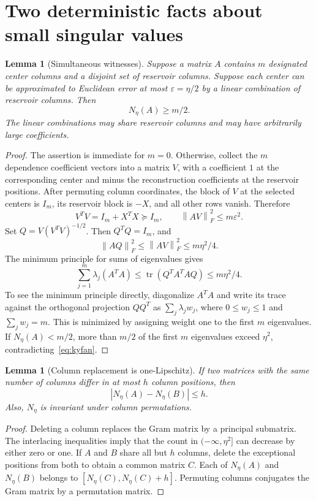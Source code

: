 \documentclass[11pt,a4paper]{article}
\newtheorem{lemma}[theorem]{Lemma}
\theoremstyle{remark}\newtheorem{remark}[theorem]{Remark}
\newcommand{\tr}{\operatorname{tr}}
\newcommand{\norm}[1]{\left\lVert #1\right\rVert}
\begin{document}
\section{Two deterministic facts about small singular values}
\begin{lemma}[Simultaneous witnesses]\label{lem:witness}
Suppose a matrix $A$ contains $m$ designated center columns and a disjoint set of reservoir columns. Suppose each center can be approximated to Euclidean error at most $\varepsilon=\eta/2$ by a linear combination of reservoir columns. Then
\[
 N_\eta(A)\ge m/2.
\]
The linear combinations may share reservoir columns and may have arbitrarily large coefficients.
\end{lemma}
\begin{proof}
The assertion is immediate for $m=0$. Otherwise, collect the $m$ dependence coefficient vectors into a matrix $V$, with a coefficient $1$ at the corresponding center and minus the reconstruction coefficients at the reservoir positions. After permuting column coordinates, the block of $V$ at the selected centers is $I_m$, its reservoir block is $-X$, and all other rows vanish. Therefore
\[
 V^TV=I_m+X^TX\succeq I_m,\qquad \norm{AV}_F^2\le m\varepsilon^2.
\]
Set $Q=V(V^TV)^{-1/2}$. Then $Q^TQ=I_m$, and
\[
 \norm{AQ}_F^2\le\norm{AV}_F^2\le m\eta^2/4.
\]
The minimum principle for sums of eigenvalues gives
\begin{equation}\label{eq:kyfan}
 \sum_{j=1}^m\lambda_j(A^TA)
 \le\tr(Q^TA^TAQ)\le m\eta^2/4.
\end{equation}
To see the minimum principle directly, diagonalize $A^TA$ and write its trace against the orthogonal projection $QQ^T$ as $\sum_j\lambda_jw_j$, where $0\le w_j\le1$ and $\sum_jw_j=m$. This is minimized by assigning weight one to the first $m$ eigenvalues. If $N_\eta(A)<m/2$, more than $m/2$ of the first $m$ eigenvalues exceed $\eta^2$, contradicting~\eqref{eq:kyfan}.
\end{proof}

\begin{lemma}[Column replacement is one-Lipschitz]\label{lem:lipschitz}
If two matrices with the same number of columns differ in at most $h$ column positions, then
\[
 |N_\eta(A)-N_\eta(B)|\le h.
\]
Also, $N_\eta$ is invariant under column permutations.
\end{lemma}
\begin{proof}
Deleting a column replaces the Gram matrix by a principal submatrix. The interlacing inequalities imply that the count in $(-\infty,\eta^2]$ can decrease by either zero or one. If $A$ and $B$ share all but $h$ columns, delete the exceptional positions from both to obtain a common matrix $C$. Each of $N_\eta(A)$ and $N_\eta(B)$ belongs to $[N_\eta(C),N_\eta(C)+h]$. Permuting columns conjugates the Gram matrix by a permutation matrix.
\end{proof}
\end{document}
